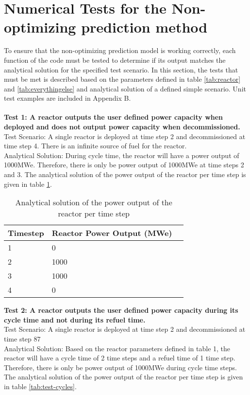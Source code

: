 \documentclass[11pt,letterpaper]{article}
\begin{document}
\newpage

\section{Numerical Tests for the Non-optimizing prediction method}
To ensure that the non-optimizing prediction model is working correctly, each function of the code must be tested to determine if its output matches the analytical solution for the specified test scenario. In this section, the tests that must be met is described based on the parameters defined in table \ref{tab:reactor} and \ref{tab:everythingelse} and analytical solution of a defined simple scenario. Unit test examples are included in Appendix B.
\\
\\
\noindent
\textbf{Test 1: A reactor outputs the user defined power capacity when deployed and does not output
power capacity when decommissioned.} \\
Test Scenario: A single reactor is deployed at time step 2 and decommissioned at time step 4. There is an infinite source of fuel for the reactor. \\
Analytical Solution: During cycle time, the reactor will have a power output of 1000MWe. Therefore,
there is only be power output of 1000MWe at time steps 2 and 3. The analytical solution of
the power output of the reactor per time step is given in table \ref{tab:test-power}.

\begin{table}[H]
     \centering
    \begin{tabularx}{\textwidth}{bbb}
       \hline
       Timestep & Reactor Power Output (MWe) \\
       \hline
       1 & 0 \\
       2 & 1000 \\
       3 & 1000 \\
       4 & 0 \\
       \hline
    \end{tabularx}
    \caption {Analytical solution of the power output of the reactor per time step}
    \label{tab:test-power}
\end{table}

\noindent
\textbf{Test 2: A reactor outputs the user defined power capacity during its cycle time and not during its refuel time.} \\
Test Scenario: A single reactor is deployed at time step 2 and decommissioned at time step 87 \\
Analytical Solution: Based on the reactor parameters defined in table 1, the reactor will have a cycle time of 2 time steps and a refuel time of 1 time step. Therefore, there is only be power output of 1000MWe during cycle time steps. The analytical solution of the power output of the reactor per time step is given in table \ref{tab:test-cycles}.
\end{document}
